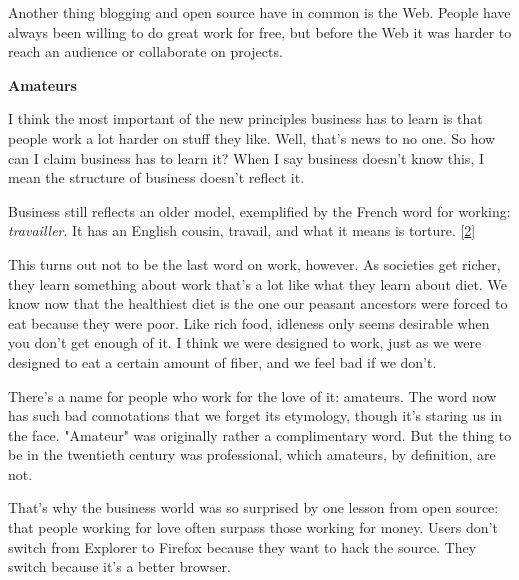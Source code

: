 Another thing
                  blogging and open source have in common is the Web. People
                  have always been willing to do great work for free, but before
                  the Web it was harder to reach an audience or collaborate on
                  projects.

\textbf{Amateurs}

I think the
                  most important of the new principles business has to learn is
                  that people work a lot harder on stuff they like. Well, that's
                  news to no one. So how can I claim business has to learn it?
                  When I say business doesn't know this, I mean the structure of
                  business doesn't reflect it.

Business still
                  reflects an older model, exemplified by the French word for
                  working: \emph{travailler}. It has an English cousin, travail,
                  and what it means is torture.
                  [\href{\#f2n}{2}]

This turns out not to be the last word on work,
                  however. As societies get richer, they learn something about
                  work that's a lot like what they learn about diet. We know now
                  that the healthiest diet is the one our peasant ancestors were
                  forced to eat because they were poor. Like rich food, idleness
                  only seems desirable when you don't get enough of it. I think
                  we were designed to work, just as we were designed to eat a
                  certain amount of fiber, and we feel bad if we don't.

There's
                  a name for people who work for the love of it: amateurs. The
                  word now has such bad connotations that we forget its
                  etymology, though it's staring us in the face. "Amateur" was
                  originally rather a complimentary word. But the thing to be in
                  the twentieth century was professional, which amateurs, by
                  definition, are not.

That's why the business world
                  was so surprised by one lesson from open source: that people
                  working for love often surpass those working for money. Users
                  don't switch from Explorer to Firefox because they want to
                  hack the source. They switch because it's a better browser.

